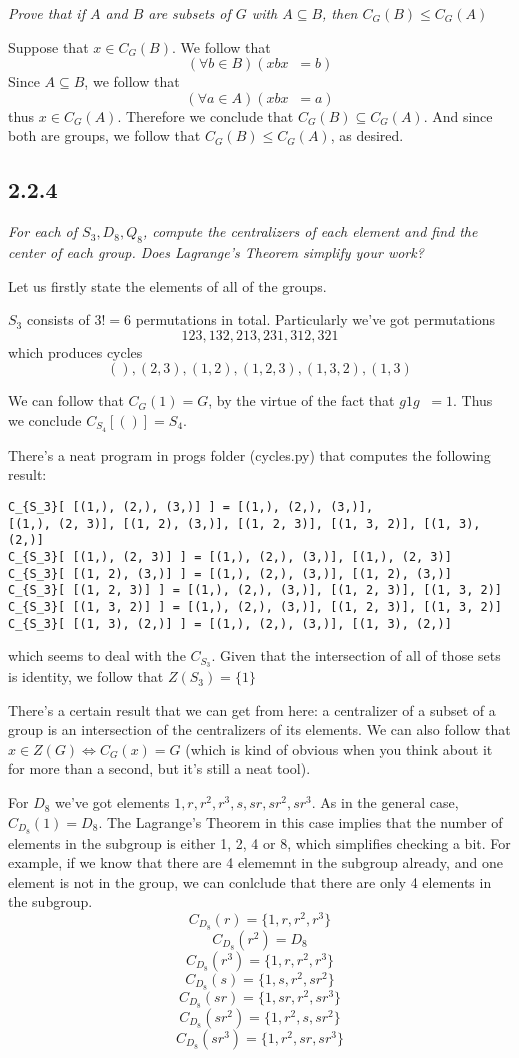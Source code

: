 \documentclass[11pt,oneside,titlepage]{book}
\DeclareMathOperator \inv {^{-1}}
\DeclareMathOperator \lra {\Leftrightarrow}
\newcommand{\set}[1]{\{ #1 \}}
\begin{document}
\textit{Prove that if $A$ and $B$ are subsets of $G$ with $A \subseteq B$, then
  $C_G(B) \leq C_G(A)$}

Suppose that $x \in C_G(B)$. We follow that
$$(\forall b \in B)(x b x \inv = b)$$
Since $A \subseteq B$, we follow that
$$(\forall a \in A)(x b x \inv = a)$$
thus $x \in C_G(A)$. Therefore we conclude that $C_G(B) \subseteq C_G(A)$. And since
both are groups, we follow that $C_G(B) \leq C_G(A)$, as desired.

\subsection*{2.2.4}

\textit{For each of $S_3, D_8, Q_8$, compute the centralizers of each element and find the
  center of each group. Does Lagrange's Theorem simplify your work?}

Let us firstly state the elements of all of the groups.

$S_3$ consists of $3! = 6$ permutations in total. Particularly we've got permutations
$$1 2 3, 1 3 2, 2 1 3, 2 3 1, 3 1 2, 3 2 1 $$
which produces cycles
$$(), (2, 3), (1, 2), (1, 2, 3), (1, 3, 2), (1, 3)$$

We can follow that $C_G(1) = G$, by the virtue of the fact that $g 1 g\inv = 1$. Thus
we conclude $C_{S_4}[()] = S_4$.

There's a neat program in progs folder (cycles.py) that computes the following result:
\begin{verbatim}
C_{S_3}[ [(1,), (2,), (3,)] ] = [(1,), (2,), (3,)],
[(1,), (2, 3)], [(1, 2), (3,)], [(1, 2, 3)], [(1, 3, 2)], [(1, 3), (2,)]
C_{S_3}[ [(1,), (2, 3)] ] = [(1,), (2,), (3,)], [(1,), (2, 3)]
C_{S_3}[ [(1, 2), (3,)] ] = [(1,), (2,), (3,)], [(1, 2), (3,)]
C_{S_3}[ [(1, 2, 3)] ] = [(1,), (2,), (3,)], [(1, 2, 3)], [(1, 3, 2)]
C_{S_3}[ [(1, 3, 2)] ] = [(1,), (2,), (3,)], [(1, 2, 3)], [(1, 3, 2)]
C_{S_3}[ [(1, 3), (2,)] ] = [(1,), (2,), (3,)], [(1, 3), (2,)]
\end{verbatim}
which seems to deal with the $C_{S_3}$. Given that the intersection of all of those
sets is identity, we follow that $Z(S_3) = \set{1}$

There's a certain result that we can get from here: a centralizer of a subset of a group
is an intersection of the centralizers of its elements. We can also follow that
$x \in Z(G) \lra C_G(x) = G$ (which is kind of obvious when you think about it for more
than a second, but it's still a neat tool).


For $D_8$ we've got elements $1, r, r^2, r^3, s, sr, sr^2, sr^3$. As in the general case,
$C_{D_8}(1) = D_8$. The Lagrange's Theorem in this case implies that the number of
elements in the subgroup is either 1, 2, 4 or 8, which simplifies checking a bit.
For example, if we know that there are 4 elememnt in the subgroup already, and one element is
not in the group, we can conlclude that there are only 4 elements in the subgroup.
$$C_{D_8}(r) = \set{1, r, r^2, r^3}$$
$$C_{D_8}(r^2) = D_8$$
$$C_{D_8}(r^3) = \set{1, r, r^2, r^3}$$
$$C_{D_8}(s) = \set{1, s, r^2, sr^2}$$
$$C_{D_8}(sr) = \set{1, sr, r^2, sr^3}$$
$$C_{D_8}(sr^2) = \set{1, r^2, s, sr^2}$$
$$C_{D_8}(sr^3) = \set{1, r^2, sr, sr^3}$$
\end{document}

